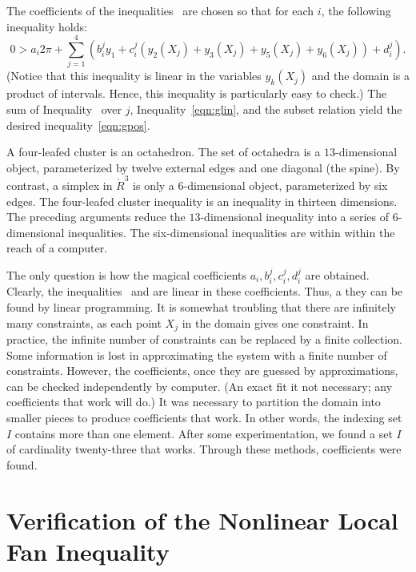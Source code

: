 The coefficients of the inequalities~
are chosen so that for each $i$, the following inequality holds:
\begin{equation}\label{eqn:glin} 
0 > a_i 2\pi + 
\sum_{j=1}^4 (b_i^j y_1 +  c_i^j (y_2(X_j)+y_3(X_j)+y_5(X_j)+y_6(X_j)) + d_i^j).
\end{equation}
(Notice that this inequality is linear in the variables $y_k(X_j)$ and
the domain is a product of intervals.  Hence, this inequality is
particularly easy to check.)  The sum of Inequality~ over $j$, Inequality~\ref{eqn:glin},
and the subset relation yield the desired inequality~\ref{eqn:gpos}.

A four-leafed cluster is an octahedron.  The set of octahedra is a
$13$-dimensional object, parameterized by twelve external edges and one
diagonal (the spine).  By contrast, a simplex in $\ring{R}^3$ is only
a $6$-dimensional object, parameterized by six edges.  The four-leafed
cluster inequality is an inequality in thirteen dimensions.  The preceding
arguments reduce the $13$-dimensional inequality into a series of
$6$-dimensional inequalities.  The six-dimensional inequalities are
within within the reach of a computer.

The only question is how the magical coefficients
$a_i,b_i^j,c_i^j,d_i^j$ are obtained.  Clearly, the
inequalities~ and  are linear in these
coefficients.  Thus, a they can be found by linear programming.  It is
somewhat troubling that there are infinitely many constraints, as each
point $X_j$ in the domain gives one constraint.  In practice, the
infinite number of constraints can be replaced by a finite collection.
Some information is lost in approximating the system with a finite
number of constraints.  However, the coefficients, once they are
guessed by approximations, can be checked independently by computer.
(An exact fit it not necessary; any coefficients that work will do.)
It was necessary to partition the domain into smaller pieces to
produce coefficients that work.  In other words, the indexing set $I$
contains more than one element.  After some experimentation, we found
a set $I$ of cardinality twenty-three that works.  Through these methods,
coefficients were found.






\section{Verification of the Nonlinear Local Fan Inequality}



